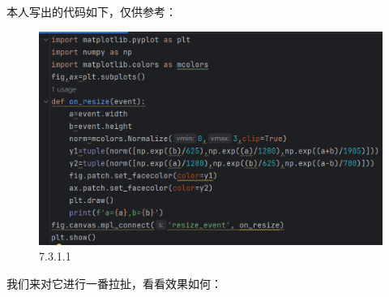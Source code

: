 \documentclass[12pt]{article}
\begin{document}
本人写出的代码如下，仅供参考：
\begin{figure}[H]
    \centering
    \includegraphics[width=0.75\linewidth]{React resize program1.png}
    \caption{7.3.1.1}
    \label{fig:enter-label}
\end{figure}
我们来对它进行一番拉扯，看看效果如何：
\end{document}
